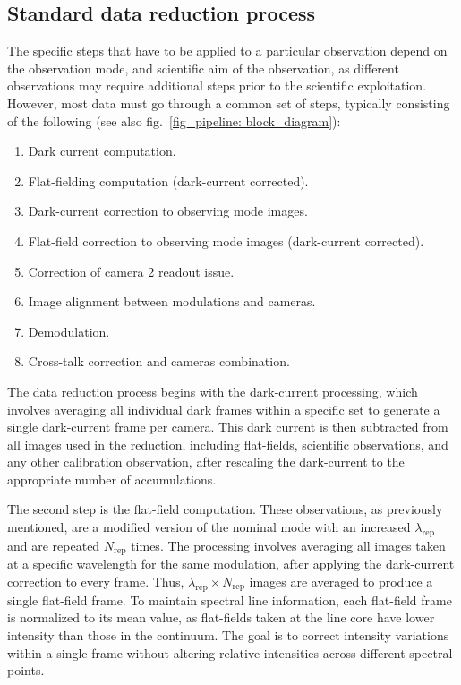 \subsection{Standard data reduction process}

The specific steps that have to be applied to a particular observation depend on the observation mode, and scientific aim of the observation, as different observations  may require additional steps prior to the scientific exploitation. However, most data must go through a common set of steps, typically consisting of the following (see also fig.~\ref{fig_pipeline: block_diagram}):

\begin{enumerate}
  \item Dark current computation. 
  \item Flat-fielding computation (dark-current corrected).
  \item Dark-current correction to observing mode images. 
  \item Flat-field correction to observing mode images (dark-current corrected).
  \item Correction of camera 2 readout issue.
  \item Image alignment between modulations and cameras. 
  \item Demodulation. 
  \item Cross-talk correction and cameras combination.
\end{enumerate}

The data reduction process begins with the dark-current processing, which involves averaging all individual dark frames within a specific set to generate a single dark-current frame per camera. This dark current is then subtracted from all images used in the reduction, including flat-fields, scientific observations, and any other calibration observation, after rescaling the dark-current to the appropriate number of accumulations.

The second step is the flat-field computation. These observations, as previously mentioned, are a modified version of the nominal mode with an increased $\lambda_{\text{rep}}$ and are repeated $N_{\text{rep}}$ times. The processing involves averaging all images taken at a specific wavelength for the same modulation, after applying the dark-current correction to every frame. Thus, $\lambda_{\text{rep}} \times N_{\text{rep}}$ images are averaged to produce a single flat-field frame. To maintain spectral line information, each flat-field frame is normalized to its mean value, as flat-fields taken at the line core have lower intensity than those in the continuum. The goal is to correct intensity variations within a single frame without altering relative intensities across different spectral points.

